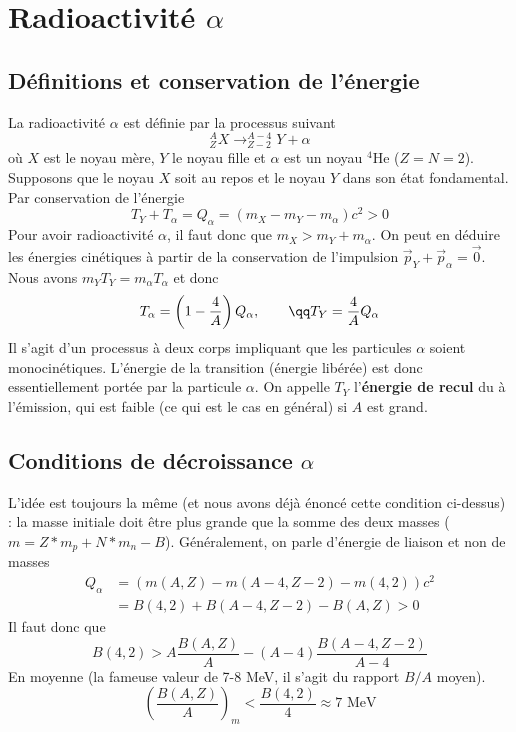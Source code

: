 \chapter{Radioactivité $\alpha$}
\section{Définitions et conservation de l'énergie}
La radioactivité $\alpha$ est définie par la processus suivant
\begin{equation}
^A_ZX \to ^{A-4}_{Z-2}Y + \alpha
\end{equation}
où $X$ est le noyau mère, $Y$ le noyau fille et $\alpha$ est un noyau $^4$He ($Z=N=2$). Supposons que le 
noyau $X$ soit au repos et le noyau $Y$ dans son état fondamental. Par conservation de l'énergie
\begin{equation}
T_Y+T_\alpha = Q_\alpha = (m_X-m_Y-m_\alpha)c^2 > 0
\end{equation}
Pour avoir radioactivité $\alpha$, il faut donc que $m_X > m_Y+m_\alpha$. On peut en déduire les énergies 
cinétiques à partir de la conservation de l'impulsion $\vec{p}_Y+\vec{p}_\alpha=\vec0$. Nous avons $m_YT_Y=
m_\alpha T_\alpha$ et donc
\begin{equation}
T_\alpha = \left(1-\frac{4}{A}\right)Q_\alpha,\qquad\qq T_Y= \frac{4}{A}Q_\alpha
\end{equation}
Il s'agit d'un processus à deux corps impliquant que les particules $\alpha$ soient monocinétiques. 
L'énergie de la transition (énergie libérée) est donc essentiellement portée par la particule $\alpha$. On
appelle $T_Y$ l'\textbf{énergie de recul} du à l’émission, qui est faible (ce qui est le cas en général) si
$A$ est grand.

\section{Conditions de décroissance $\alpha$}
L'idée est toujours la même (et nous avons déjà énoncé cette condition ci-dessus) : la masse initiale doit être
plus grande que la somme des deux masses ($m=Z*m_p+N*m_n-B$). Généralement, on parle d'énergie de liaison et non de
masses
\begin{equation}
\begin{array}{ll}
Q_\alpha &= (m(A,Z)-m(A-4,Z-2)-m(4,2))c^2\\
&= B(4,2)+B(A-4,Z-2)-B(A,Z) >0
\end{array}
\end{equation}
Il faut donc que
\begin{equation}
B(4,2) > A\frac{B(A,Z)}{A}-(A-4)\frac{B(A-4,Z-2)}{A-4}
\end{equation}
En moyenne (la fameuse valeur de 7-8 MeV, il s'agit du rapport $B/A$ moyen).
\begin{equation}
\left(\frac{B(A,Z)}{A}\right)_m < \frac{B(4,2)}{4}\approx 7\text{ MeV}
\end{equation}

